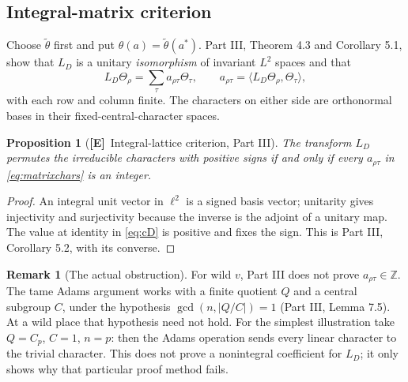 \documentclass[11pt]{article}
\newcommand{\Z}{\mathbb Z}
\newcommand{\Etag}{\textnormal{\textbf{[E]}}}
\theoremstyle{plain}
\newtheorem{proposition}[theorem]{Proposition}
\theoremstyle{definition}
\newtheorem{remark}[theorem]{Remark}
\begin{document}
\subsection{Integral-matrix criterion}\label{subsec:integral}
Choose $\widetilde\theta$ first and put
$\theta(a)=\widetilde\theta(a^*)$.
Part III, Theorem 4.3 and Corollary 5.1, show that $L_D$ is a
unitary \emph{isomorphism} of invariant $L^2$ spaces and that
\begin{equation}\label{eq:matrixchars}
 L_D\Theta_\rho=\sum_\tau a_{\rho\tau}\Theta_\tau,
 \qquad a_{\rho\tau}=\langle L_D\Theta_\rho,
 \Theta_\tau\rangle,
\end{equation}
with each row and column finite.  The characters on either side
are orthonormal bases in their fixed-central-character spaces.

\begin{proposition}[\Etag\ Integral-lattice criterion, Part III]\label{prop:int}
The transform $L_D$ permutes the irreducible characters with
positive signs if and only if every $a_{\rho\tau}$ in
\eqref{eq:matrixchars} is an integer.
\end{proposition}
\begin{proof}
An integral unit vector in $\ell^2$ is a signed basis vector;
unitarity gives injectivity and surjectivity because the inverse
is the adjoint of a unitary map.  The value at identity in
\eqref{eq:cD} is positive and fixes the sign.
This is Part III, Corollary 5.2, with its converse.
\end{proof}

\begin{remark}[The actual obstruction]
For wild $v$, Part III does not prove
$a_{\rho\tau}\in\Z$.  The tame Adams argument works with a
finite quotient $Q$ and a central subgroup $C$, under the
hypothesis $\gcd(n,|Q/C|)=1$ (Part III, Lemma 7.5).
At a wild place that hypothesis need not hold.  For the
simplest illustration take $Q=C_p$, $C=1$, $n=p$: then the
Adams operation sends every linear character to the trivial
character.  This does not prove a nonintegral coefficient for
$L_D$; it only shows why that particular proof method fails.
\end{remark}
\end{document}
